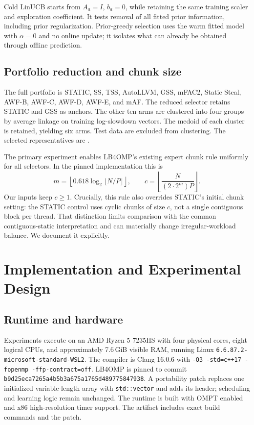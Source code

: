 \documentclass[10pt,letterpaper]{article}
\newcommand{\code}[1]{\texttt{#1}}
\begin{document}
Cold LinUCB starts from $A_a=I$, $b_a=0$, while retaining the same training
scaler and exploration coefficient. It tests removal of all fitted prior
information, including prior regularization. Prior-greedy selection uses the
warm fitted model with $\alpha=0$ and no online update; it isolates what can
already be obtained through offline prediction.

\subsection{Portfolio reduction and chunk size}

The full portfolio is STATIC, SS, TSS, AutoLLVM, GSS, mFAC2, Static Steal,
AWF-B, AWF-C, AWF-D, AWF-E, and mAF. The reduced selector retains STATIC and
GSS as anchors. The other ten arms are clustered into four groups by average
linkage on training log-slowdown vectors. The medoid of each cluster is
retained, yielding six arms. Test data are excluded from clustering.
The selected representatives are \ReducedArms{}.

The primary experiment enables LB4OMP's existing expert chunk rule uniformly
for all selectors. In the pinned implementation this is
\begin{equation}
 m=\left\lfloor0.618\log_2\lfloor N/P\rfloor\right\rfloor,
 \qquad c=\left\lfloor\frac{N}{(2\cdot2^m)P}\right\rfloor.
\end{equation}
Our inputs keep $c\geq1$. Crucially, this rule also overrides STATIC's initial
chunk setting: the STATIC control uses cyclic chunks of size $c$, not a
single contiguous block per thread. That distinction limits comparison with
the common contiguous-static interpretation and can materially change
irregular-workload balance. We document it explicitly.

\section{Implementation and Experimental Design}

\subsection{Runtime and hardware}

Experiments execute on an AMD Ryzen 5 7235HS with four physical cores, eight
logical CPUs, and approximately 7.6\,GiB visible RAM, running Linux
\code{6.6.87.2-microsoft-standard-WSL2}. The compiler is Clang 16.0.6 with
\code{-O3 -std=c++17 -fopenmp -ffp-contract=off}. LB4OMP is pinned to commit
\code{b9d25eca7265a4b5b3a675a1765d489775847938}.
A portability patch replaces one initialized variable-length array with
\code{std::vector} and adds its header; scheduling and learning logic remain
unchanged. The runtime is built with OMPT enabled and x86 high-resolution
timer support. The artifact includes exact build commands and the patch.
\end{document}
